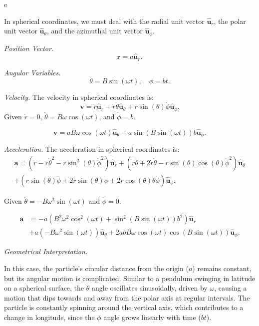 \begin{solution}{6.4}{e}


    In spherical coordinates, we must deal with the radial unit vector \(\hat{\mathbf{u}}_r\), the polar unit vector \(\hat{\mathbf{u}}_\theta\), and the azimuthal unit vector \(\hat{\mathbf{u}}_\phi\).
    
    \textit{Position Vector.}
    \[
    \mathbf{r} = a \hat{\mathbf{u}}_{r}.
    \]
    
    \textit{Angular Variables.}
    \[
    \theta = B \sin(\omega t), \quad \phi = b t.
    \]
    
    \textit{Velocity.}
    The velocity in spherical coordinates is:
    \[
    \mathbf{v} = \dot{r} \hat{\mathbf{u}}_r + r \dot{\theta} \hat{\mathbf{u}}_\theta + r \sin(\theta) \dot{\phi} \hat{\mathbf{u}}_\phi.
    \]
    Given \( \dot{r} = 0 \), \( \dot{\theta} = B \omega \cos(\omega t) \), and \( \dot{\phi} = b \).
    
    \[
    \mathbf{v} = a B \omega \cos(\omega t) \hat{\mathbf{u}}_\theta + a \sin(B \sin(\omega t)) b \hat{\mathbf{u}}_\phi.
    \]
    
    \textit{Acceleration.}
    The acceleration in spherical coordinates is:
    \[
    \begin{aligned}
    \mathbf{a} = (\ddot{r} - r \dot{\theta}^2 - r \sin^2(\theta) \dot{\phi}^2) \hat{\mathbf{u}}_r + (r \ddot{\theta} + 2 \dot{r} \dot{\theta} - r \sin(\theta) \cos(\theta) \dot{\phi}^2) \hat{\mathbf{u}}_\theta\\ 
    + (r \sin(\theta) \ddot{\phi} + 2 \dot{r} \sin(\theta) \dot{\phi} + 2 r \cos(\theta) \dot{\theta} \dot{\phi}) \hat{\mathbf{u}}_\phi.
    \end{aligned}
    \]
    
    Given \( \ddot{\theta} = -B \omega^2 \sin(\omega t) \) and \( \ddot{\phi} = 0 \).
    
    \[
    \begin{aligned}
    \mathbf{a} &= -a (B^2 \omega^2 \cos^2(\omega t) + \sin^2(B \sin(\omega t)) b^2) \hat{\mathbf{u}}_r \\
    &+ a (-B \omega^2 \sin(\omega t)) \hat{\mathbf{u}}_\theta + 2 a b B \omega \cos(\omega t) \cos(B \sin(\omega t)) \hat{\mathbf{u}}_\phi.
    \end{aligned}
    \]

    \textit{Geometrical Interpretation.}
    
    In this case, the particle's circular distance from the origin (\(a\)) remains constant, but its angular motion is complicated. Similar to a pendulum swinging in latitude on a spherical surface, the \(\theta\) angle oscillates sinusoidally, driven by \(\omega\), causing a motion that dips towards and away from the polar axis at regular intervals. The particle is constantly spinning around the vertical axis, which contributes to a change in longitude, since the \(\phi\) angle grows linearly with time (\(bt\)).
    

\end{solution}
